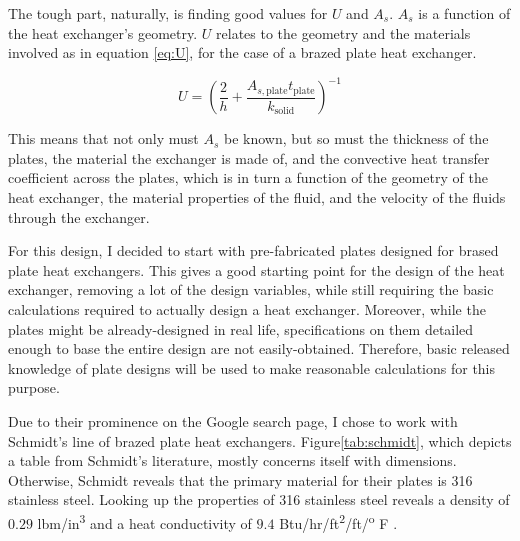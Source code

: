 \documentclass[12pt,letterpaper]{article}
\begin{document}
The tough part, naturally, is finding good values for \(U\) and \(A_s\). \(A_s\) is a function of the heat exchanger's geometry.  \(U\) relates to the geometry and the materials involved as in equation \ref{eq:U}, for the case of a brazed plate heat exchanger.

\begin{equation}
\label{eq:U}
U = \left(\frac{2}{h} + \frac{A_{s, \textrm{plate}} t_{\textrm{plate}}}{k_{\textrm{solid}}} \right)^{-1}
\end{equation}

This means that not only must \(A_s\) be known, but so must the thickness of the plates, the material the exchanger is made of, and the convective heat transfer coefficient across the plates, which is in turn a function of the geometry of the heat exchanger, the material properties of the fluid, and the velocity of the fluids through the exchanger.

For this design, I decided to start with pre-fabricated plates designed for brased plate heat exchangers. This gives a good starting point for the design of the heat exchanger, removing a lot of the design variables, while still requiring the basic calculations required to actually design a heat exchanger. Moreover, while the plates might be already-designed in real life, specifications on them detailed enough to base the entire design are not easily-obtained. Therefore, basic released knowledge of plate designs will be used to make reasonable calculations for this purpose.

Due to their prominence on the Google search page, I chose to work with Schmidt's line of brazed plate heat exchangers. Figure\ref{tab:schmidt}, which depicts a table from Schmidt's literature, mostly concerns itself with dimensions. Otherwise, Schmidt reveals that the primary material for their plates is 316 stainless steel. Looking up the properties of 316 stainless steel reveals a density of \(0.29\) lbm/in\textsuperscript{3} and a heat conductivity of \(9.4\) Btu/hr/ft\textsuperscript{2}/ft/\textsuperscript{o} F .
\end{document}
